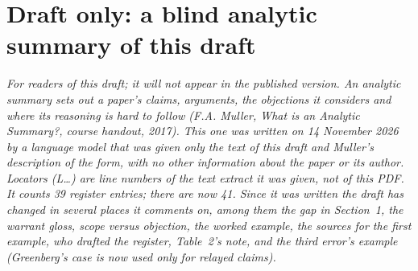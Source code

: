 \section{Draft only: a blind analytic summary of this draft}
\label{app:analytic}

\noindent\textit{For readers of this draft; it will not appear in the published version.
An analytic summary sets out a paper's claims, arguments, the objections it considers and
where its reasoning is hard to follow (F.A. Muller, \textit{What is an Analytic Summary?}, course handout, 2017). This one was written on 14 November
2026 by a language model that was given only the text of this draft and Muller's description
of the form, with no other information about the paper or its author. Locators (L\ldots) are line numbers of the text extract it was given, not of this PDF. It counts 39 register entries; there are now 41.  Since it was written the draft has changed in several places it comments on, among them the gap in Section~1, the warrant gloss, scope versus objection, the worked example, the sources for the first example, who drafted the register, Table~2's note, and the third error's example (Greenberg's case is now used only for relayed claims).}

